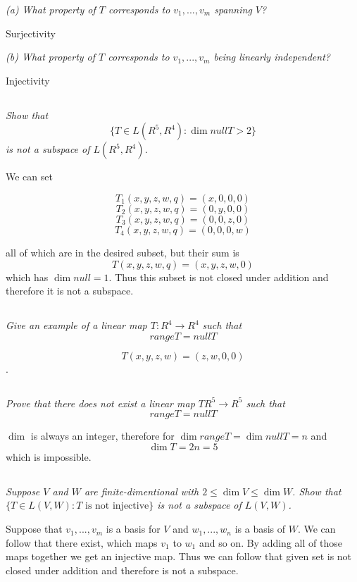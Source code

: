 \documentclass[11pt,oneside,titlepage]{book}
\begin{document}
\textit{(a) What property of $T$ corresponds to $v_1, ..., v_m$ spanning $V$?}

Surjectivity

\textit{(b) What property of $T$ corresponds to $v_1, ..., v_m$ being linearly independent?}

Injectivity

\subsection{}

\textit{Show that }
$$ \{T \in L(R^5, R^4): \dim null T > 2 \}$$
\textit{is not a subspace of $L(R^5, R^4)$.}

We can set

$$T_1(x, y, z, w, q) = (x, 0, 0, 0)$$
$$T_2(x, y, z, w, q) = (0, y, 0, 0)$$
$$T_3(x, y, z, w, q) = (0, 0, z, 0)$$
$$T_4(x, y, z, w, q) = (0, 0, 0, w)$$

all of which are in the desired subset, but their sum is
$$T(x, y, z, w, q) = (x, y, z, w, 0)$$
which has $\dim null = 1$. Thus this subset is not closed under addition and therefore it
is not a subspace.

\subsection{}

\textit{Give an example of a linear map $T: R^4 \to R^4$ such that }
$$range T = null T$$

$$T(x, y, z, w) = (z, w, 0, 0)$$.

\subsection{}

\textit{Prove that there does not exist a linear map $T R^5 \to R^5$ such that }
$$range T = null T$$

$\dim$ is always an integer, therefore for $\dim range T = \dim null T = n$ and
$$\dim T = 2n = 5$$
which is impossible.

\subsection{}

\textit{Suppose $V$ and $W$ are finite-dimentional with $2 \leq \dim V \leq \dim W$.
  Show that $\{T \in L(V, W): T \text{ is not injective}\}$ is not a subspace of $L(V, W)$.}

Suppose that $v_1, ..., v_m$ is a basis for $V$ and $w_1, ..., w_n$ is a basis of $W$.
We can follow that there exist, which maps $v_1$ to $w_1$ and so on. By adding all of
those maps together we get an injective map. Thus we can follow that given set is not
closed under addition and therefore is not a subspace.
\end{document}
